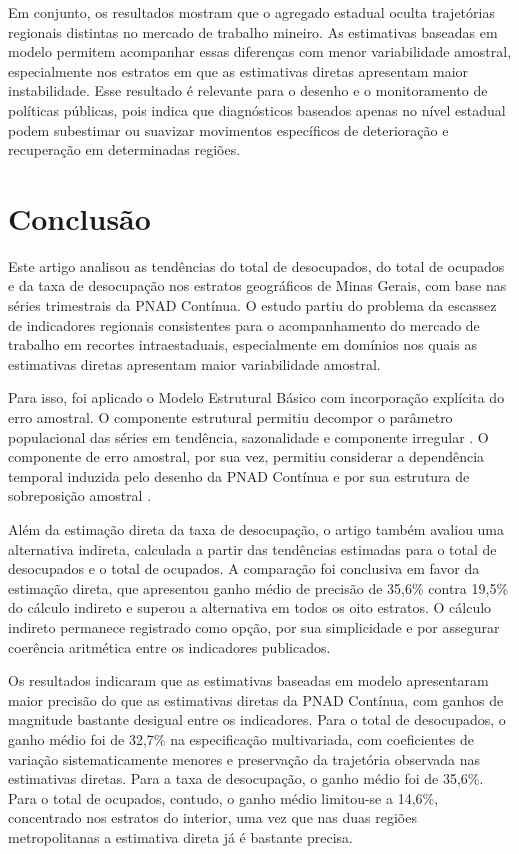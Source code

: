 \documentclass[rbe,wwwview]{econbr}
\begin{document}
Em conjunto, os resultados mostram que o agregado estadual oculta trajetórias regionais distintas no mercado de trabalho mineiro. As estimativas baseadas em modelo permitem acompanhar essas diferenças com menor variabilidade amostral, especialmente nos estratos em que as estimativas diretas apresentam maior instabilidade. Esse resultado é relevante para o desenho e o monitoramento de políticas públicas, pois indica que diagnósticos baseados apenas no nível estadual podem subestimar ou suavizar movimentos específicos de deterioração e recuperação em determinadas regiões.

\section{Conclusão}
\label{sec:conclusão}

Este artigo analisou as tendências do total de desocupados, do total de ocupados e da taxa de desocupação nos estratos geográficos de Minas Gerais, com base nas séries trimestrais da PNAD Contínua. O estudo partiu do problema da escassez de indicadores regionais consistentes para o acompanhamento do mercado de trabalho em recortes intraestaduais, especialmente em domínios nos quais as estimativas diretas apresentam maior variabilidade amostral.

Para isso, foi aplicado o Modelo Estrutural Básico com incorporação explícita do erro amostral. O componente estrutural permitiu decompor o parâmetro populacional das séries em tendência, sazonalidade e componente irregular \citep{harvey1989}. O componente de erro amostral, por sua vez, permitiu considerar a dependência temporal induzida pelo desenho da PNAD Contínua e por sua estrutura de sobreposição amostral \citep{scott1974,scott1977}.

Além da estimação direta da taxa de desocupação, o artigo também avaliou uma alternativa indireta, calculada a partir das tendências estimadas para o total de desocupados e o total de ocupados. A comparação foi conclusiva em favor da estimação direta, que apresentou ganho médio de precisão de 35,6\% contra 19,5\% do cálculo indireto e superou a alternativa em todos os oito estratos. O cálculo indireto permanece registrado como opção, por sua simplicidade e por assegurar coerência aritmética entre os indicadores publicados.

Os resultados indicaram que as estimativas baseadas em modelo apresentaram maior precisão do que as estimativas diretas da PNAD Contínua, com ganhos de magnitude bastante desigual entre os indicadores. Para o total de desocupados, o ganho médio foi de 32,7\% na especificação multivariada, com coeficientes de variação sistematicamente menores e preservação da trajetória observada nas estimativas diretas. Para a taxa de desocupação, o ganho médio foi de 35,6\%. Para o total de ocupados, contudo, o ganho médio limitou-se a 14,6\%, concentrado nos estratos do interior, uma vez que nas duas regiões metropolitanas a estimativa direta já é bastante precisa.
\end{document}
